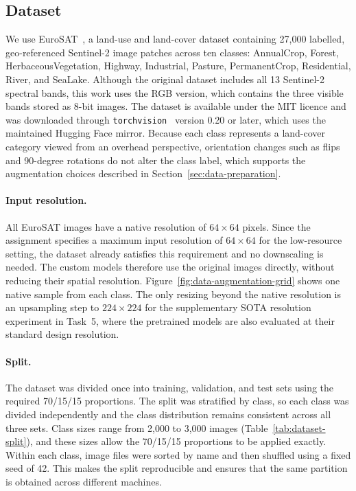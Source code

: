 
\subsection{Dataset}
\label{sec:dataset}

We use EuroSAT~\cite{helber2019eurosat}, a land-use and land-cover dataset
containing 27,000 labelled, geo-referenced Sentinel-2 image patches across ten
classes: AnnualCrop, Forest, HerbaceousVegetation, Highway, Industrial,
Pasture, PermanentCrop, Residential, River, and SeaLake. Although the original
dataset includes all 13 Sentinel-2 spectral bands, this work uses the RGB
version, which contains the three visible bands stored as 8-bit images. The
dataset is available under the MIT licence and was downloaded through
\texttt{torchvision}~\cite{torchvision2016} version 0.20 or later, which uses
the maintained Hugging Face mirror. Because each class represents a land-cover
category viewed from an overhead perspective, orientation changes such as
flips and 90-degree rotations do not alter the class label, which supports the
augmentation choices described in Section~\ref{sec:data-preparation}.

\paragraph{Input resolution.}
All EuroSAT images have a native resolution of $64\times64$ pixels. Since the
assignment specifies a maximum input resolution of $64\times64$ for the
low-resource setting, the dataset already satisfies this requirement and no
downscaling is needed. The custom models therefore use the original images
directly, without reducing their spatial resolution.
Figure~\ref{fig:data-augmentation-grid} shows one native sample from each
class. The only resizing beyond the native resolution is an upsampling step to
$224\times224$ for the supplementary SOTA resolution experiment in Task~5,
where the pretrained models are also evaluated at their standard design
resolution.

\paragraph{Split.}
The dataset was divided once into training, validation, and test sets using
the required 70/15/15 proportions. The split was stratified by class, so each
class was divided independently and the class distribution remains consistent
across all three sets. Class sizes range from 2,000 to 3,000 images
(Table~\ref{tab:dataset-split}), and these sizes allow the 70/15/15
proportions to be applied exactly. Within each class, image files were sorted
by name and then shuffled using a fixed seed of 42. This makes the split
reproducible and ensures that the same partition is obtained across different
machines.

